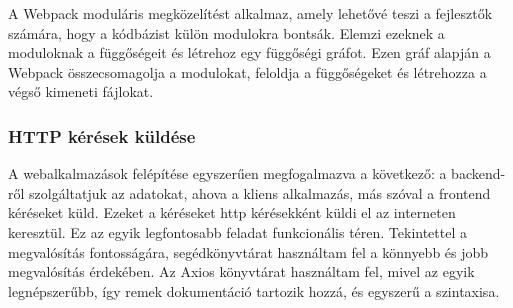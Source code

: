 \documentclass[a4paper,twoside]{article}
\begin{document}
A Webpack moduláris megközelítést alkalmaz, amely lehetővé teszi a fejlesztők számára,
hogy a kódbázist külön modulokra bontsák. Elemzi ezeknek a moduloknak a függőségeit
és létrehoz egy függőségi gráfot. Ezen gráf alapján a Webpack összecsomagolja a
modulokat, feloldja a függőségeket és létrehozza a végső kimeneti fájlokat.

\subsubsection{HTTP kérések küldése}\label{axios-tech}
A webalkalmazások felépítése egyszerűen megfogalmazva a következő: a backend-ről szolgáltatjuk az adatokat, ahova a kliens alkalmazás, más szóval a frontend kéréseket küld. Ezeket a kéréseket http kérésekként küldi el az interneten keresztül. Ez az egyik legfontosabb feladat funkcionális téren. Tekintettel a megvalósítás fontosságára, segédkönyvtárat használtam fel a könnyebb és jobb megvalósítás érdekében. Az Axios\cite{axiosLibrary} könyvtárat használtam fel, mivel az egyik legnépszerűbb, így remek dokumentáció tartozik hozzá, és egyszerű a szintaxisa. 
\end{document}
